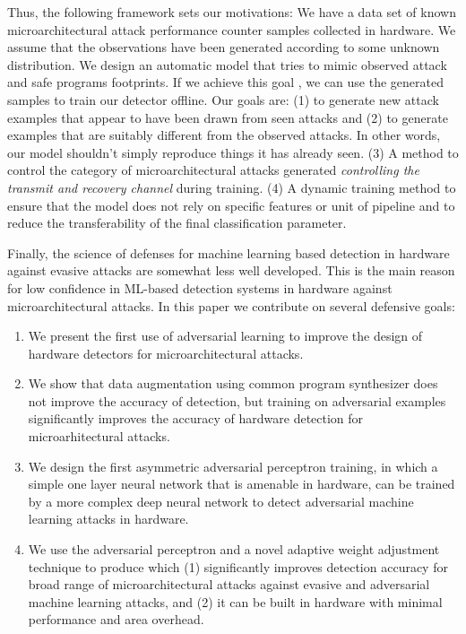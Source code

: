  
 Thus, the following framework sets our motivations:
  We have a data set of known   microarchitectural attack performance counter samples collected in hardware. 
 We assume that the observations have been generated according to some unknown distribution. 
 We design an automatic model that tries to mimic observed attack and safe programs footprints. If we achieve this goal , we can use the generated samples to train our detector offline. Our goals are: (1) to generate new attack examples that appear to have been drawn from seen attacks and (2) to generate examples that are suitably different from the observed attacks. In other words, our model shouldn't simply reproduce things it has already seen. (3) A method to control the category of microarchitectural attacks generated {\em controlling the transmit and recovery channel} during training. (4) A dynamic training method to ensure that the model does not rely on specific features or unit of pipeline and to reduce the  transferability of the final classification parameter. 
 
 
 
Finally, the science of defenses for machine learning based  detection in hardware against evasive attacks are somewhat less well developed. This is the main reason for low confidence in ML-based detection systems in hardware against microarchitectural attacks. In this paper we contribute on several defensive goals:

\begin{enumerate}
\item We present the first use of adversarial learning to improve the
design of hardware detectors for microarchitectural attacks. 
\vspace{2mm}

\item We show that data augmentation using common program synthesizer does not improve the accuracy of detection, but training on adversarial examples significantly improves the accuracy of hardware detection for microarhitectural attacks. 

\item We design the first asymmetric  adversarial perceptron training, in which a simple one layer neural network that is amenable in hardware, can be trained  by a more complex deep neural network to detect adversarial machine learning attacks in hardware.


\item We use the adversarial perceptron and a novel adaptive weight adjustment technique to produce \scheme{} which (1) significantly improves detection accuracy for broad range of microarchitectural attacks against evasive and adversarial machine learning attacks, and (2) it can be built in hardware with minimal performance and area overhead. 
\end{enumerate}
